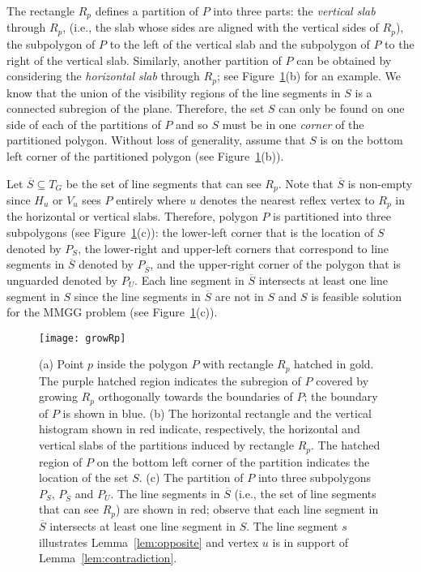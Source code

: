 \documentclass{llncs}
\begin{document}
The rectangle $R_p$ defines a partition of $P$ into three parts: the \emph{vertical slab} through $R_p$, (i.e., the slab
whose sides are aligned with the vertical sides of $R_p$), the subpolygon of $P$ to the left of the vertical slab and the subpolygon of $P$ to the
right of the vertical slab. Similarly, another partition of $P$ can be obtained by considering the \emph{horizontal slab} through $R_p$; see
Figure~\ref{fig:growingRp}(b) for an example. We know that the union of the visibility regions of the line segments in $S$ is a
connected subregion of the plane. Therefore, the set $S$ can only be found on one side of each of the partitions of $P$ and so $S$ must be
in one \emph{corner} of the partitioned polygon. Without loss of generality, assume that $S$ is on the bottom left corner of the partitioned polygon
(see Figure~\ref{fig:growingRp}(b)).

Let $\overline{S}\subseteq T_G$ be the set of line segments that can see $R_p$. Note that $\overline{S}$
is non-empty since $H_u$ or $V_u$ sees $P$ entirely where $u$ denotes the nearest reflex vertex to $R_p$ in the horizontal or vertical slabs. Therefore, polygon $P$ is partitioned into three subpolygons (see Figure~\ref{fig:growingRp}(c)): the lower-left corner that is the location of $S$ denoted by $P_S$, the lower-right and upper-left corners that correspond to line segments in $\overline{S}$ denoted by $P_{\overline{S}}$, and the upper-right corner of the polygon that is unguarded denoted by $P_U$.
Each line segment in $\overline{S}$ intersects at least one line segment in $S$
since the line segments in $\overline{S}$ are not in $S$ and $S$ is feasible solution for the MMGG problem (see Figure~\ref{fig:growingRp}(c)).

\begin{figure}[t]
\centering \texttt{[image: growRp]}
\caption{(a) Point $p$ inside the polygon $P$ with rectangle $R_p$ hatched in gold. The purple hatched region
indicates the subregion of $P$ covered by growing $R_p$ orthogonally towards the boundaries of $P$; the boundary
of $P$ is shown in blue.
(b) The horizontal rectangle and the vertical histogram shown in red indicate, respectively, the horizontal and vertical slabs of the partitions induced
by rectangle $R_p$. The hatched region of $P$ on the bottom left corner of the partition indicates the location of the set $S$. (c) The partition of $P$ into three subpolygons $P_S$, $P_{\overline{S}}$ and $P_U$. The line segments in $\overline{S}$
(i.e., the set of line segments that can see $R_p$) are shown in red; observe that each line segment in $\overline{S}$ intersects at least one line
segment in $S$. The line segment $s$ illustrates Lemma~\ref{lem:opposite} and vertex $u$ is in support of Lemma~\ref{lem:contradiction}.}
\label{fig:growingRp}\end{figure}
\end{document}

